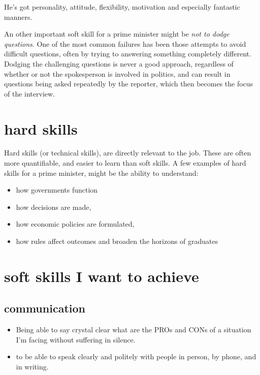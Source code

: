 \documentclass[a4paper,12pt]{article}
\begin{document}
He's got personality, attitude, flexibility, motivation and especially fantastic manners.

An other important soft skill for a prime minister might be \emph{not to dodge questions}.
One of the most common failures has been those attempts to avoid difficult questions, often by trying to answering something completely different.
Dodging the challenging questions is never a good approach, regardless of whether or not the spokesperson is involved in politics, and can result in questions being asked repeatedly by the reporter, which then becomes the focus of the interview.

\clearpage

\section{hard skills}
Hard skills (or technical skills), are directly relevant to the job. These are often more quantifiable, and easier to learn than soft skills.
A few examples of hard skills for a prime minister, might be the ability to understand:

\begin{itemize}

\item  how governments function 
\item  how decisions are made,
\item  how economic policies are formulated,
\item  how rules affect outcomes and broaden the horizons of graduates

\end{itemize}



\section{soft skills I want to achieve}

\subsection{communication}

\begin{itemize}
\item Being able to say crystal clear what are the PROs and CONs of a situation I'm facing without suffering in silence.
\item to be able to speak clearly and politely with people in person, by phone, and in writing.
\end{itemize}
\end{document}
